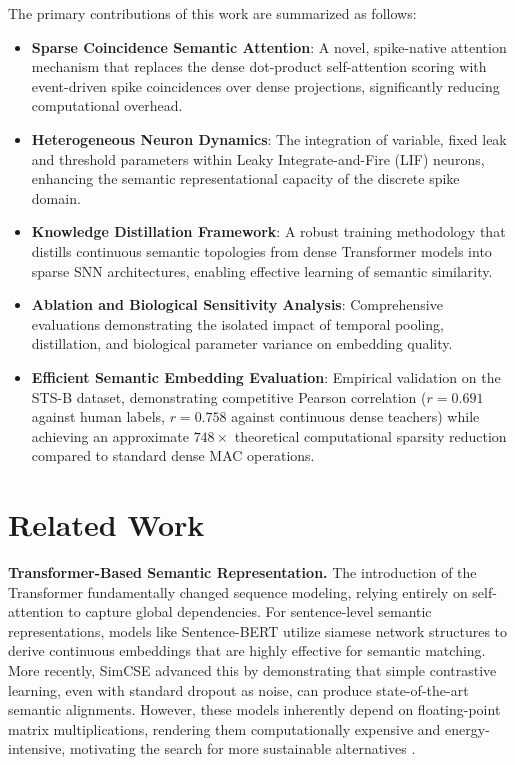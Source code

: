\documentclass{article} %
\begin{document}
The primary contributions of this work are summarized as follows:
\begin{itemize}
    \item \textbf{Sparse Coincidence Semantic Attention}: A novel, spike-native attention mechanism that replaces the dense dot-product self-attention scoring with event-driven spike coincidences over dense projections, significantly reducing computational overhead.
    \item \textbf{Heterogeneous Neuron Dynamics}: The integration of variable, fixed leak and threshold parameters within Leaky Integrate-and-Fire (LIF) neurons, enhancing the semantic representational capacity of the discrete spike domain.
    \item \textbf{Knowledge Distillation Framework}: A robust training methodology that distills continuous semantic topologies from dense Transformer models into sparse SNN architectures, enabling effective learning of semantic similarity.
    \item \textbf{Ablation and Biological Sensitivity Analysis}: Comprehensive evaluations demonstrating the isolated impact of temporal pooling, distillation, and biological parameter variance on embedding quality.
    \item \textbf{Efficient Semantic Embedding Evaluation}: Empirical validation on the STS-B dataset, demonstrating competitive Pearson correlation ($r=0.691$ against human labels, $r=0.758$ against continuous dense teachers) while achieving an approximate $748\times$ theoretical computational sparsity reduction compared to standard dense MAC operations.
\end{itemize}

\section{Related Work}

\textbf{Transformer-Based Semantic Representation.} The introduction of the Transformer \citep{vaswani2017attention} fundamentally changed sequence modeling, relying entirely on self-attention to capture global dependencies. For sentence-level semantic representations, models like Sentence-BERT \citep{reimers2019sentence} utilize siamese network structures to derive continuous embeddings that are highly effective for semantic matching. More recently, SimCSE \citep{gao2021simcse} advanced this by demonstrating that simple contrastive learning, even with standard dropout as noise, can produce state-of-the-art semantic alignments. However, these models inherently depend on floating-point matrix multiplications, rendering them computationally expensive and energy-intensive, motivating the search for more sustainable alternatives \citep{kitaev2020reformer, wang2020linformer, tay2022efficient}.
\end{document}
